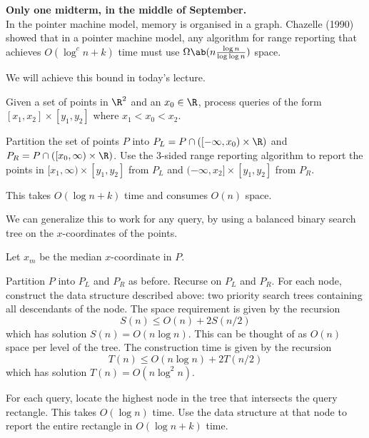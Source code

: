 
\textbf{Only one midterm, in the middle of September.} \\

In the pointer machine model, memory is organised in a graph.
Chazelle (1990) showed that in a pointer machine model, any algorithm
for range reporting that achieves $O(\log^c n + k)$ time must use
$\Omega\ab(n \frac{\log n}{\log \log n})$ space.

We will achieve this bound in today's lecture.

\begin{question*} \label{que:ors:special}
    Given a set of points in $\R^2$ and an $x_0 \in \R$,
    process queries of the form
    $[x_1, x_2] \times [y_1, y_2]$ where $x_1 < x_0 < x_2$.
\end{question*}
\begin{solution}
    Partition the set of points $P$ into
    $P_L = P \cap ([-\infty, x_0) \times \R)$
    and $P_R = P \cap ([x_0, \infty) \times \R)$.
    Use the 3-sided range reporting algorithm to report the points in
    $[x_1, \infty) \times [y_1, y_2]$ from $P_L$ and
    $(-\infty, x_2] \times [y_1, y_2]$ from $P_R$.

    This takes $O(\log n + k)$ time and consumes $O(n)$ space.
\end{solution}

We can generalize this to work for any query, by using a balanced binary
search tree on the $x$-coordinates of the points.
\begin{solution}
    Let $x_m$ be the median $x$-coordinate in $P$.

    Partition $P$ into $P_L$ and $P_R$ as before.
    Recurse on $P_L$ and $P_R$.
    For each node, construct the data structure described above:
    two priority search trees containing all descendants of the node.
    The space requirement is given by the recursion \[
        S(n) \le O(n) + 2S(n/2)
    \] which has solution $S(n) = O(n \log n)$.
    This can be thought of as $O(n)$ space per level of the tree.
    The construction time is given by the recursion \[
        T(n) \le O(n \log n) + 2T(n/2)
    \] which has solution $T(n) = O(n \log^2 n)$.

    For each query, locate the highest node in the tree that intersects
    the query rectangle.
    This takes $O(\log n)$ time.
    Use the data structure at that node to report the entire rectangle in
    $O(\log n + k)$ time.
\end{solution}

